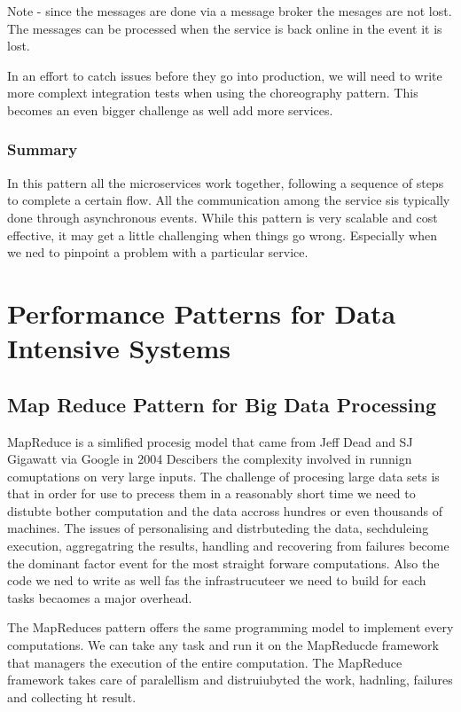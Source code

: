 \documentclass[a4paper, 11pt]{book}
\begin{document}
    Note - since the messages are done via a message broker the mesages are not lost.
    The messages can be processed when the service is back online in the event it is lost.

    In an effort to catch issues before they go into production, we will need to write more complext integration tests when using the choreography pattern.
    This becomes an even bigger challenge as well add more services.

    \subsubsection{Summary}
    In this pattern all the microservices work together, following a sequence of steps to complete a certain flow.
    All the communication among the service sis typically done through asynchronous events.
    While this pattern is very scalable and cost effective, it may get a little challenging when things go wrong.
    Especially when we ned to pinpoint a problem with a particular service.


    \section{Performance Patterns for Data Intensive Systems}

    \subsection{Map Reduce Pattern for Big Data Processing}
    MapReduce is a simlified procesig model that came from Jeff Dead and SJ Gigawatt via Google in 2004
    Descibers the complexity involved in runnign comuptations on very large inputs.
    The challenge of procesing large data sets is that in order for use to precess them in a reasonably short time we need to distubte bother computation and the data accross hundres or even thousands of machines.
    The issues of personalising and distrbuteding the data, sechduleing execution, aggregatring the results, handling and recovering from failures become the dominant factor event for the most straight forware computations.
    Also the code we ned to write as well fas the infrastrucuteer we need to build for each tasks becaomes a major overhead.

    The MapReduces pattern offers the same programming model to implement every computations.
    We can take any task and run it on the MapReducde framework that managers the execution of the entire computation.
    The MapReduce framework takes care of paralellism and distruiubyted the work, hadnling, failures and collecting ht result.
\end{document}
